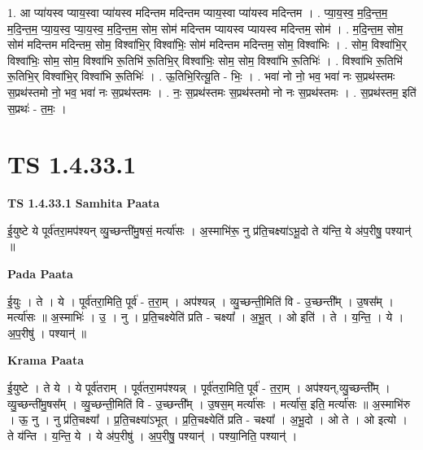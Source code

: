\documentclass[17pt]{extarticle}
\begin{document}
1. आ प्या॑यस्व प्याय॒स्वा प्या॑यस्व मदिन्तम मदिन्तम प्याय॒स्वा प्या॑यस्व मदिन्तम । . प्या॒य॒स्व॒ म॒दि॒न्त॒म॒ म॒दि॒न्त॒म॒ प्या॒य॒स्व॒ प्या॒य॒स्व॒ म॒दि॒न्त॒म॒ सोम॒ सोम॑ मदिन्तम प्यायस्व प्यायस्व मदिन्तम॒ सोम॑ । . म॒दि॒न्त॒म॒ सोम॒ सोम॑ मदिन्तम मदिन्तम॒ सोम॒ विश्वा॑भि॒र् विश्वा॑भिः॒ सोम॑ मदिन्तम मदिन्तम॒ सोम॒ विश्वा॑भिः । . सोम॒ विश्वा॑भि॒र् विश्वा॑भिः॒ सोम॒ सोम॒ विश्वा॑भि रू॒तिभि॑ रू॒तिभि॒र् विश्वा॑भिः॒ सोम॒ सोम॒ विश्वा॑भि रू॒तिभिः॑ । . विश्वा॑भि रू॒तिभि॑ रू॒तिभि॒र् विश्वा॑भि॒र् विश्वा॑भि रू॒तिभिः॑ । . ऊ॒तिभि॒रित्यू॒ति - भिः॒ । . भवा॑ नो नो॒ भव॒ भवा॑ नः स॒प्रथ॑स्तमः स॒प्रथ॑स्तमो नो॒ भव॒ भवा॑ नः स॒प्रथ॑स्तमः । . नः॒ स॒प्रथ॑स्तमः स॒प्रथ॑स्तमो नो नः स॒प्रथ॑स्तमः । . स॒प्रथ॑स्तम॒ इति॑ स॒प्रथः॑ - त॒मः॒ । \newline
\pagebreak
{}

\section{ TS 1.4.33.1 }

\textbf{TS 1.4.33.1 } \newline
\textbf{Samhita Paata} \newline

ई॒युष्टे ये पूर्व॑तरा॒मप॑श्यन् व्यु॒च्छन्ती॑मु॒षसं॒ मर्त्या॑सः । अ॒स्माभि॑रू॒ नु प्र॑ति॒चक्ष्या॑ऽभू॒दो ते य॑न्ति॒ ये अ॑प॒रीषु॒ पश्यान्॑ ॥ \newline

\textbf{Pada Paata} \newline

ई॒युः । ते । ये । पूर्व॑तरा॒मिति॒ पूर्व॑ - त॒रा॒म् । अप॑श्यन्न् । व्यु॒च्छन्ती॒मिति॑ वि - उ॒च्छन्ती᳚म् । उ॒षस᳚म् । मर्त्या॑सः ॥ अ॒स्माभिः॑ । उ॒ । नु । प्र॒ति॒चक्ष्येति॑ प्रति - चक्ष्या᳚ । अ॒भू॒त् । ओ इति॑ । ते । य॒न्ति॒ । ये । अ॒प॒रीषु॑ । पश्यान्॑ ॥  \newline


\textbf{Krama Paata} \newline

ई॒युष्टे । ते ये । ये पूर्व॑तराम् । पूर्व॑तरा॒मप॑श्यन्न् । पूर्व॑तरा॒मिति॒ पूर्व॑ - त॒रा॒म् । अप॑श्यन्,व्यु॒च्छन्ती᳚म् । व्यु॒च्छन्ती॑मु॒षस᳚म् । व्यु॒च्छन्ती॒मिति॑ वि - उ॒च्छन्ती᳚म् । उ॒षस॒म् मर्त्या॑सः । मर्त्या॑स॒ इति॒ मर्त्या॑सः ॥ अ॒स्माभि॑रु । ऊ॒ नु । नु प्र॑ति॒चक्ष्या᳚ । प्र॒ति॒चक्ष्या॑ऽभूत् । प्र॒ति॒चक्ष्येति॑ प्रति - चक्ष्या᳚ । अ॒भू॒दो । ओ ते । ओ इत्यो । ते य॑न्ति । य॒न्ति॒ ये । ये अ॑प॒रीषु॑ । अ॒प॒रीषु॒ पश्यान्॑ । पश्या॒निति॒ पश्यान्॑ । \newline
\end{document}
